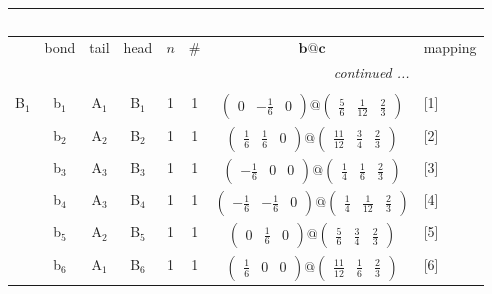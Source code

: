 \documentclass[fleqn,10pt,landscape]{article}
\begin{document}
\begin{itemize}
\begin{center}
\begin{longtable}{cc|cc|c|c|c|l}
\multicolumn{7}{l}{\tablename\ \thetable{}} \\
 \hline \hline
 & bond & tail & head & $n$ & \# & $\bm{b}@\bm{c}$ & mapping \\ \hline \endhead

 \hline \hline
\multicolumn{7}{r}{\footnotesize\it continued ...} \\ \endfoot

 \hline \hline
\multicolumn{7}{r}{} \\ \endlastfoot

B$_{1}$ & b$_{1}$ & A$_{1}$ & B$_{1}$ & 1 & 1 & $\begin{pmatrix} 0 & - \frac{1}{6} & 0 \end{pmatrix}@\begin{pmatrix} \frac{5}{6} & \frac{1}{12} & \frac{2}{3} \end{pmatrix}$ & [1] \\
& b$_{2}$ & A$_{2}$ & B$_{2}$ & 1 & 1 & $\begin{pmatrix} \frac{1}{6} & \frac{1}{6} & 0 \end{pmatrix}@\begin{pmatrix} \frac{11}{12} & \frac{3}{4} & \frac{2}{3} \end{pmatrix}$ & [2] \\
& b$_{3}$ & A$_{3}$ & B$_{3}$ & 1 & 1 & $\begin{pmatrix} - \frac{1}{6} & 0 & 0 \end{pmatrix}@\begin{pmatrix} \frac{1}{4} & \frac{1}{6} & \frac{2}{3} \end{pmatrix}$ & [3] \\
& b$_{4}$ & A$_{3}$ & B$_{4}$ & 1 & 1 & $\begin{pmatrix} - \frac{1}{6} & - \frac{1}{6} & 0 \end{pmatrix}@\begin{pmatrix} \frac{1}{4} & \frac{1}{12} & \frac{2}{3} \end{pmatrix}$ & [4] \\
& b$_{5}$ & A$_{2}$ & B$_{5}$ & 1 & 1 & $\begin{pmatrix} 0 & \frac{1}{6} & 0 \end{pmatrix}@\begin{pmatrix} \frac{5}{6} & \frac{3}{4} & \frac{2}{3} \end{pmatrix}$ & [5] \\
& b$_{6}$ & A$_{1}$ & B$_{6}$ & 1 & 1 & $\begin{pmatrix} \frac{1}{6} & 0 & 0 \end{pmatrix}@\begin{pmatrix} \frac{11}{12} & \frac{1}{6} & \frac{2}{3} \end{pmatrix}$ & [6] \\
\end{longtable}
\end{center}


\end{itemize}
\end{document}
